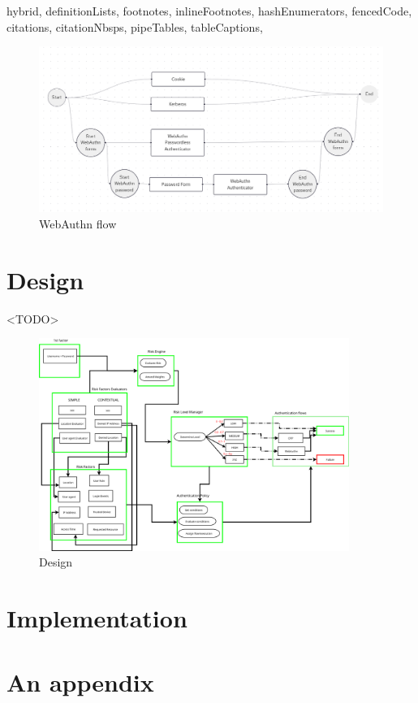\documentclass[
  digital,     %
  oneside,     %
  nosansbold,  %
  nocolorbold, %
  lof,         %
  lot,         %
]{fithesis4}
\begin{document}
\begin{markdown*}{%
  hybrid,
  definitionLists,
  footnotes,
  inlineFootnotes,
  hashEnumerators,
  fencedCode,
  citations,
  citationNbsps,
  pipeTables,
  tableCaptions,
}
\begin{figure}[htbp]
  \centering
  \includegraphics[width=1.04\textwidth]{img/flow.png}
  \caption{WebAuthn flow}
  \label{fig:basic-auth-flow}
\end{figure}

\chapter{Design}
\shorthandoff{-}

<TODO>
\begin{figure}
    \centering
    \includegraphics[width=0.9\textwidth]{img/Design1.0.png}
    \caption{Design}
    \label{fig:design}
\end{figure}

\chapter{Implementation}
\shorthandoff{-}

\end{markdown*}
\shorthandon{-}

\printbibliography[heading=bibintoc]

\appendix %
\chapter{An appendix}
\end{document}
